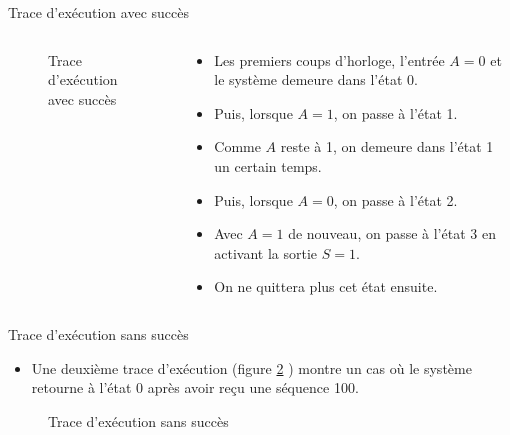 \documentclass[presentation]{beamer}
\begin{document}
\begin{frame}[label={sec:org4b685a4}]{Trace d'exécution avec succès}
\begin{columns}
\begin{column}{0.35\columnwidth}
\begin{block}{}
\begin{figure}[htbp]
\centering

\caption{\label{fig:orgaa62ec5}Trace d'exécution avec succès}
\end{figure}
\end{block}
\end{column}

\begin{column}{0.61\columnwidth}
\begin{block}{}
\begin{itemize}
\item Les premiers coups d'horloge, l'entrée \(A=0\) et le système demeure dans l'état 0.

\item Puis, lorsque \(A=1\), on passe à l'état 1.

\item Comme \(A\) reste à 1, on demeure dans l'état 1 un certain temps.

\item Puis, lorsque \(A=0\), on passe à l'état 2.

\item Avec \(A=1\) de nouveau, on passe à l'état 3 en activant la sortie \(S=1\).

\item On ne quittera plus cet état ensuite.
\end{itemize}
\end{block}
\end{column}
\end{columns}
\end{frame}

\begin{frame}[label={sec:orgccb6767}]{Trace d'exécution sans succès}
\begin{itemize}
\item Une deuxième trace d'exécution (figure \ref{fig:org0e973ca} ) montre un cas où le système retourne à l'état 0 après avoir reçu une séquence 100.
\end{itemize}

\begin{figure}[htbp]
\centering

\caption{\label{fig:org0e973ca}Trace d'exécution sans succès}
\end{figure}
\end{frame}
\end{document}
